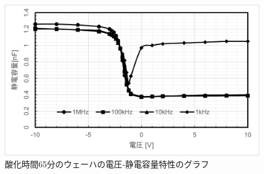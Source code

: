 \documentclass[11pt]{jarticle}
\begin{document}
			\begin{figure}[H]
			\centering
			\includegraphics[width = 12cm]{figs/wehacap65.png}
			\caption{酸化時間65分のウェーハの電圧‐静電容量特性のグラフ}
			\label{fig:wehacap65}
			\end{figure}
\end{document}
